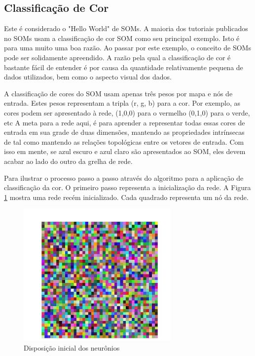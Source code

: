 \subsection{Classificação de Cor}
Este é considerado o "Hello World" de SOMs. A maioria dos tutoriais publicados no
SOMs usam a classificação de cor SOM como seu principal exemplo. Isto é para uma muito
uma boa razão. Ao passar por este exemplo, o conceito de SOMs pode ser solidamente
apreendido. A razão pela qual a classificação de cor é bastante fácil de entender é por causa da
quantidade relativamente pequena de dados utilizados, bem como o aspecto visual dos
dados.

A classificação de cores do SOM usam apenas três pesos por mapa e nós de entrada.
Estes pesos representam a tripla (r, g, b) para a cor. Por exemplo, as cores podem
ser apresentado à rede, (1,0,0) para o vermelho (0,1,0) para o verde, etc A meta para
a rede aqui, é para aprender a representar todas essas cores de entrada em sua grade de duas dimensões,
mantendo as propriedades intrínsecas de tal como mantendo as
relações topológicas entre os vetores de entrada. Com isso em mente, se azul escuro
e azul claro são apresentados ao SOM, eles devem acabar ao lado do outro
da grelha de rede.

Para ilustrar o processo passo a passo através do algoritmo para a
aplicação de classificação da cor. O primeiro passo representa a inicialização da rede. A Figura \ref{fig:initial-node}
mostra uma rede recém inicializado. Cada quadrado representa um nó da rede.

\begin{figure}[ht]
\centering
\includegraphics[width=0.7\textwidth]{imgs/initial-node.png}
\caption{Disposição inicial dos neurônios}
\label{fig:initial-node}
\end{figure}


